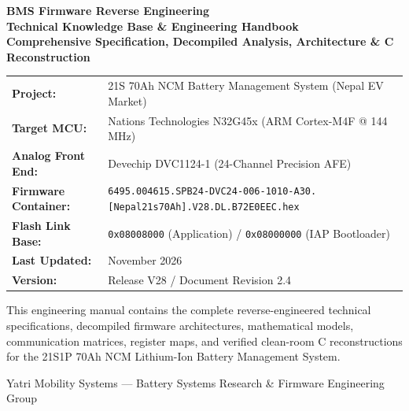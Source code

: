 \documentclass[10pt,a4paper]{article}
\begin{document}
\begin{titlepage}
\begin{center}
    \vspace*{1cm}
    {\Huge \bfseries \color{NavyBlue} BMS Firmware Reverse Engineering}\\[0.5cm]
    {\LARGE \bfseries \color{DarkTeal} Technical Knowledge Base \& Engineering Handbook}\\[0.8cm]
    {\large \textbf{Comprehensive Specification, Decompiled Analysis, Architecture \& C Reconstruction}}\\[1.5cm]
    
    \begin{tcolorbox}[enhanced,colback=LightGray,colframe=NavyBlue,width=0.95\textwidth,arc=4pt,boxrule=1.2pt]
    \centering
    \begin{tabular}{ll}
        \textbf{Project:} & 21S 70Ah NCM Battery Management System (Nepal EV Market) \\
        \textbf{Target MCU:} & Nations Technologies N32G45x (ARM Cortex-M4F @ 144 MHz) \\
        \textbf{Analog Front End:} & Devechip DVC1124-1 (24-Channel Precision AFE) \\
        \textbf{Firmware Container:} & \texttt{6495.004615.SPB24-DVC24-006-1010-A30.[Nepal21s70Ah].V28.DL.B72E0EEC.hex} \\
        \textbf{Flash Link Base:} & \texttt{0x08008000} (Application) / \texttt{0x08000000} (IAP Bootloader) \\
        \textbf{Last Updated:} & November 2026 \\
        \textbf{Version:} & Release V28 / Document Revision 2.4 \\
    \end{tabular}
    \end{tcolorbox}
    
    \vspace{2cm}
    \begin{calloutbox}
    This engineering manual contains the complete reverse-engineered technical specifications, decompiled firmware architectures, mathematical models, communication matrices, register maps, and verified clean-room C reconstructions for the 21S1P 70Ah NCM Lithium-Ion Battery Management System.
    \end{calloutbox}
    
    \vfill
    {\small \color{SlateGray} Yatri Mobility Systems --- Battery Systems Research \& Firmware Engineering Group}
\end{center}
\end{titlepage}
\end{document}
